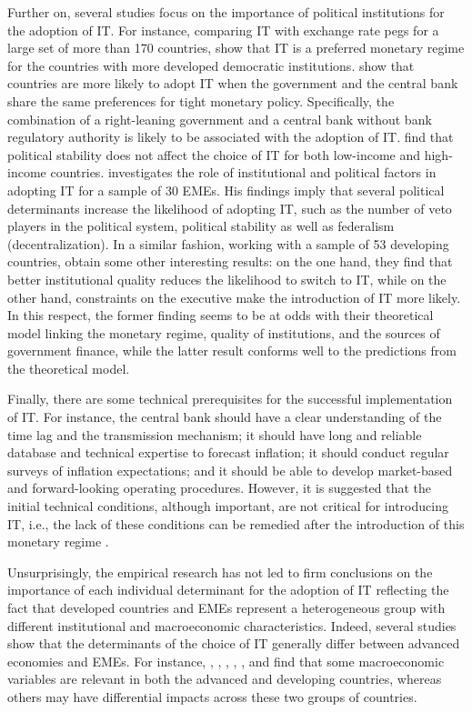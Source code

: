 \documentclass{article}
\begin{document}
Further on, several studies focus on the importance of political institutions for the adoption of IT. For instance, comparing IT with exchange rate pegs for a large set of more than 170 countries, \citet{rose2014} show that IT is a preferred monetary regime for the countries with more developed democratic institutions. \citet{mukherjee2008} show that countries are more likely to adopt IT when the government and the central bank share the same preferences for tight monetary policy. Specifically, the combination of a right-leaning government and a central bank without bank regulatory authority is likely to be associated with the adoption of IT. \citet{ismailov2016} find that political stability does not affect the choice of IT for both low-income and high-income countries. \citet{lucotte2010, lucotte2012} investigates the role of institutional and political factors in adopting IT for a sample of 30 EMEs. His findings imply that several political determinants increase the likelihood of adopting IT, such as the number of veto players in the political system, political stability as well as federalism (decentralization). In a similar fashion, working with a sample of 53 developing countries, \citet{minea2021} obtain some other interesting results: on the one hand, they find that better institutional quality reduces the likelihood to switch to IT, while on the other hand, constraints on the executive make the introduction of IT more likely. In this respect, the former finding seems to be at odds with their theoretical model linking the monetary regime, quality of institutions, and the sources of government finance, while the latter result conforms well to the predictions from the theoretical model.

Finally, there are some technical prerequisites for the successful implementation of IT. For instance, the central bank should have a clear understanding of the time lag and the transmission mechanism; it should have long and reliable database and technical expertise to forecast inflation; it should conduct regular surveys of inflation expectations; and it should be able to develop market-based and forward-looking operating procedures. However, it is suggested that the initial technical conditions, although important, are not critical for introducing IT, i.e., the lack of these conditions can be remedied after the introduction of this monetary regime \citep{Battini2007, Carare2002, IMF2006, Mishkin2007}.

Unsurprisingly, the empirical research has not led to firm conclusions on the importance of each individual determinant for the adoption of IT reflecting the fact that developed countries and EMEs represent a heterogeneous group with different institutional and macroeconomic characteristics. Indeed, several studies show that the determinants of the choice of IT generally differ between advanced economies and EMEs. For instance, \citet{ardakani2018}, \citet{fry-mckibbin2014}, \citet{ismailov2016}, \citet{samarina2014}, \citet{samarina2014}, and \citet{thornton2017} find that some macroeconomic variables are relevant in both the advanced and developing countries, whereas others may have differential impacts across these two groups of countries.
\end{document}
